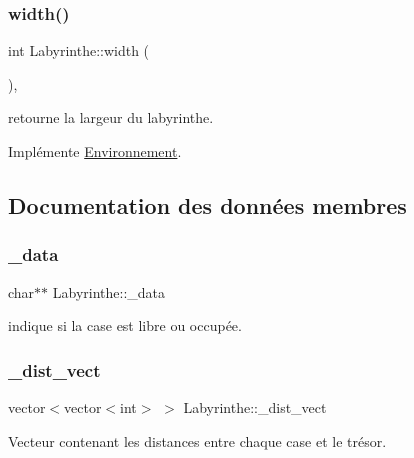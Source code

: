 \subsubsection{\texorpdfstring{width()}{width()}}
{\footnotesize\ttfamily int Labyrinthe\+::width (\begin{DoxyParamCaption}{ }\end{DoxyParamCaption})\hspace{0.3cm}{\ttfamily [inline]}, {\ttfamily [virtual]}}



retourne la largeur du labyrinthe. 



Implémente \hyperlink{classEnvironnement_a9f5945b3cde5bd2b0d46250446989081}{Environnement}.



\subsection{Documentation des données membres}
\mbox{\label{classLabyrinthe_a93ccbd26c14359bec6a9898575f69237}} 
\subsubsection{\texorpdfstring{\+\_\+data}{\_data}}
{\footnotesize\ttfamily char$\ast$$\ast$ Labyrinthe\+::\+\_\+data\hspace{0.3cm}{\ttfamily [private]}}



indique si la case est libre ou occupée. 

\mbox{\label{classLabyrinthe_a63f1ac088c5b93cd8c099e7cce3ef4dc}} 
\subsubsection{\texorpdfstring{\+\_\+dist\+\_\+vect}{\_dist\_vect}}
{\footnotesize\ttfamily vector$<$vector$<$int$>$ $>$ Labyrinthe\+::\+\_\+dist\+\_\+vect\hspace{0.3cm}{\ttfamily [private]}}



Vecteur contenant les distances entre chaque case et le trésor. 

